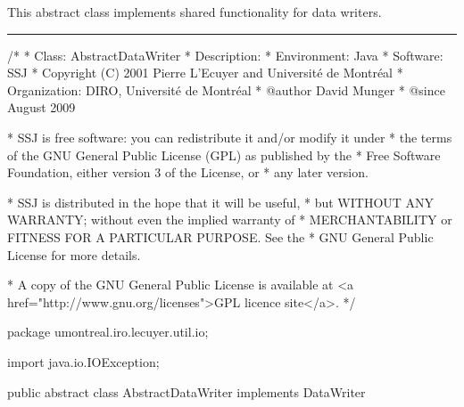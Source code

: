 
This abstract class implements shared functionality for data writers.

\bigskip\hrule

\begin{code}
\begin{hide}
/*
 * Class:        AbstractDataWriter
 * Description:  
 * Environment:  Java
 * Software:     SSJ 
 * Copyright (C) 2001  Pierre L'Ecuyer and Université de Montréal
 * Organization: DIRO, Université de Montréal
 * @author       David Munger 
 * @since        August 2009

 * SSJ is free software: you can redistribute it and/or modify it under
 * the terms of the GNU General Public License (GPL) as published by the
 * Free Software Foundation, either version 3 of the License, or
 * any later version.

 * SSJ is distributed in the hope that it will be useful,
 * but WITHOUT ANY WARRANTY; without even the implied warranty of
 * MERCHANTABILITY or FITNESS FOR A PARTICULAR PURPOSE.  See the
 * GNU General Public License for more details.

 * A copy of the GNU General Public License is available at
   <a href="http://www.gnu.org/licenses">GPL licence site</a>.
 */
\end{hide}
package umontreal.iro.lecuyer.util.io;
\begin{hide}
import java.io.IOException;
\end{hide}

public abstract class AbstractDataWriter implements DataWriter \begin{hide} {
\end{hide}
\end{code}

